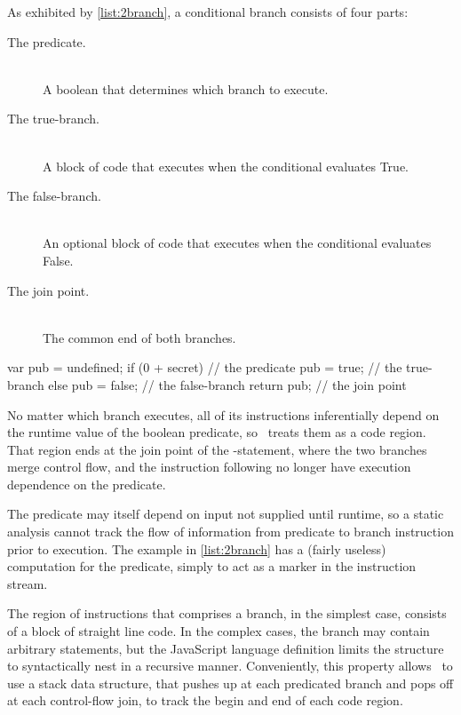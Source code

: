 As exhibited by \autoref{list:2branch}, a conditional branch consists of four parts:
\begin{description}
  \item [The predicate.] \hfill \\
    A boolean that determines which branch to execute.
  \item [The true-branch.] \hfill \\
    A block of code that executes when the conditional evaluates True.
  \item [The false-branch.] \hfill \\
    An optional block of code that executes when the conditional evaluates False.
  \item [The join point.] \hfill \\
    The common end of both branches.
\end{description}

\begin{jscode}
    var pub = undefined;
    if (0 + secret) {      // the predicate
        pub = true;        // the true-branch
    } else {
        pub = false;       // the false-branch
    }
    return pub;            // the join point
\end{jscode}

No matter which branch executes, all of its instructions inferentially depend on the runtime value of the boolean predicate, so \FlowCore\ treats them as a code region.
That region ends at the join point of the -statement, where the two branches merge control flow, and the instruction following no longer have execution dependence on the predicate.

The predicate may itself depend on input not supplied until runtime, so a static analysis cannot track the flow of information from predicate to branch instruction prior to execution.
The example in \autoref{list:2branch} has a (fairly useless) computation for the predicate, simply to act as a marker in the instruction stream.

The region of instructions that comprises a branch, in the simplest case, consists of a block of straight line code.
In the complex cases, the branch may contain arbitrary statements, but the JavaScript language definition limits the structure to syntactically nest in a recursive manner.
Conveniently, this property allows \FlowCore\ to use a stack data structure, that pushes up at each predicated branch and pops off at each control-flow join, to track the begin and end of each code region.

